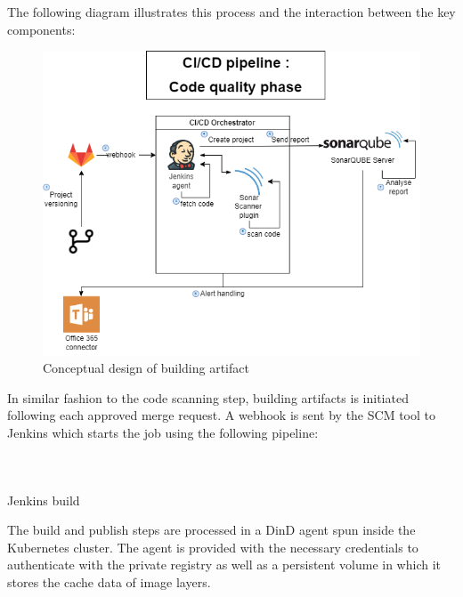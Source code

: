 The following diagram illustrates this process and the interaction between the key components: 

\begin{figure}[H]\centering
\includegraphics[width=1.0\textwidth,angle=00]{assets/f48.png}
\caption{Conceptual design of building artifact }
\label{fig:Conceptual design of building artifact }
\end{figure}


In similar fashion to the code scanning step, building artifacts is initiated following each approved merge request. A webhook is sent by the SCM tool to Jenkins which starts the job using the following pipeline: 

\begin{listing}[H]
    \inputminted[firstline=1,lastline=40]{Dockerfile}{codeListing/Jenkinsfile_build}
\end{listing}

\begin{listing}[H]
    \inputminted[firstline=41,lastline=75]{Dockerfile}{codeListing/Jenkinsfile_build}
\end{listing}

\begin{listing}[H]
    \inputminted[firstline=76]{Dockerfile}{codeListing/Jenkinsfile_build}
    \caption{Jenkins build}
    \label{lst:jenkinsfile_build}
\end{listing}

The build and publish steps are processed in a DinD agent spun inside the Kubernetes cluster. The agent is provided with the necessary credentials to authenticate with the private registry as well as a persistent volume in which it stores the cache data of image layers. 


